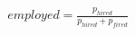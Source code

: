 \documentclass[preview]{standalone}
\begin{document}
\begin{align*}
employed = \frac{p_{hired}}{p_{hired} + p_{fired}}
\end{align*}
\end{document}
